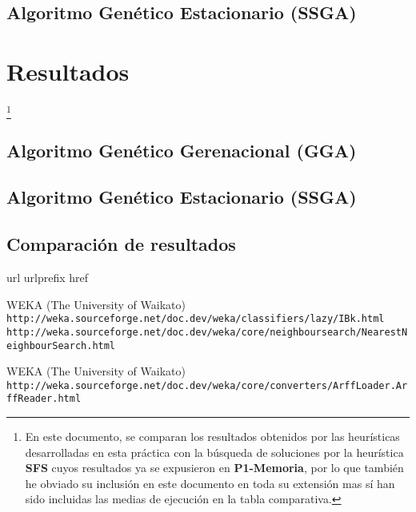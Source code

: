 \documentclass[a4paper, 11pt]{article}
\begin{document}
			
			
		\subsection{Algoritmo Genético Estacionario (\textbf{SSGA})}
			
		
	\section{Resultados}\footnote{En este documento, se comparan los resultados obtenidos por las
	heurísticas desarrolladas en esta práctica con la búsqueda de soluciones por la heurística
	\textbf{SFS} cuyos resultados ya se expusieron en \textbf{P1-Memoria}, por lo que también he
	obviado su inclusión en este documento en toda su extensión mas sí han sido incluidas las medias
	de ejecución en la tabla comparativa.}
		\subsection{Algoritmo Genético Gerenacional (\textbf{GGA})}
			
			
			
		\subsection{Algoritmo Genético Estacionario (\textbf{SSGA})}
			
			
			
			
		\subsection{Comparación de resultados}
			
			
	
	\newpage
	
	\begin{thebibliography}{10}
	\expandafter\ifx\csname url\endcsname\relax
	  \def\url#1{\texttt{#1}}\fi
	\expandafter\ifx\csname urlprefix\endcsname\relax\def\urlprefix{URL }\fi
	\expandafter\ifx\csname href\endcsname\relax
	  \def\href#1#2{#2} \def\path#1{#1}\fi
	
	WEKA (The University of Waikato)\\
	  \url{http://weka.sourceforge.net/doc.dev/weka/classifiers/lazy/IBk.html}\\
	  \url{http://weka.sourceforge.net/doc.dev/weka/core/neighboursearch/NearestNeighbourSearch.html}
	  
  	WEKA (The University of Waikato)\\
	  \url{http://weka.sourceforge.net/doc.dev/weka/core/converters/ArffLoader.ArffReader.html}
	  
	\end{thebibliography}
\end{document}
